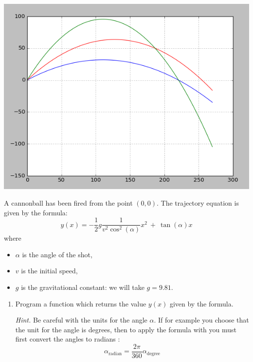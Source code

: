 \documentclass[11pt,class=report,crop=false]{standalone}
\begin{document}
\begin{activite}[Ballistics]



\begin{center}
\includegraphics[scale=\myscale,scale=0.45]{screen-lists-I-tir-bis}
\end{center}

A cannonball has been fired from the point $(0,0)$. The trajectory equation is given by the formula:
$$y(x) = -\frac12  g \frac{1}{v^2 \cos^2(\alpha)} x^2 \  + \   \tan (\alpha)  x$$
where
\begin{itemize}
  \item $\alpha$ is the angle of the shot,
  \item $v$ is the initial speed,
  \item $g$ is the gravitational constant: we will take $g = 9.81$.
\end{itemize}


\begin{enumerate}
  \item Program a  function
  which returns the value $y(x)$ given by the formula.
  
  \emph{Hint.} Be careful with the units for the angle $\alpha$. If for example you choose that the unit for the angle is degrees, then to apply the formula with \Python{} you must first convert the angles to radians :
  $$\alpha_{\text{radian}} = \frac{2\pi}{360} \alpha_{\text{degree}}$$
  

\end{enumerate}
\end{activite}
\end{document}
